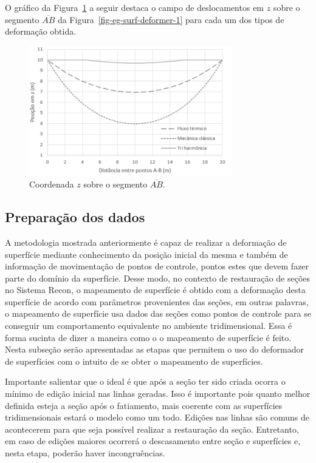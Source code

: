 O gráfico da Figura~\ref{fig-eg-surf-deformer-3} a seguir destaca o campo de deslocamentos em $z$ sobre o segmento $\overline{AB}$ da Figura~\ref{fig-eg-surf-deformer-1} para cada um dos tipos de deformação obtida.

\begin{figure} [H]
  \begin{center}
    \includegraphics[width=250pt]{images/fig-eg-surf-deformer-3}
    \caption{Coordenada $z$ sobre o segmento $\overline{AB}$.\cite{Muller}}\label{fig-eg-surf-deformer-3}
  \end{center}
\end{figure}

\subsection{Preparação dos dados}

 
A metodologia mostrada anteriormente é capaz de realizar a deformação de superfície mediante conhecimento da posição inicial da mesma e também de informação de movimentação de pontos de controle, pontos estes que devem fazer parte do domínio da superfície. Desse modo, no contexto de restauração de seções no Sistema Recon, o mapeamento de superfície é obtido com a deformação desta superfície de acordo com parâmetros provenientes das seções, em outras palavras, o mapeamento de superfície usa dados das seções como pontos de controle para se conseguir um comportamento equivalente no ambiente tridimensional. Essa é forma sucinta de dizer a maneira como o o mapeamento de superfície é feito. Nesta subseção serão apresentadas as etapas que permitem o uso do deformador de superfícies com o intuito de se obter o mapeamento de superfícies.

Importante salientar que o ideal é que após a seção ter sido criada ocorra o mínimo de edição inicial nas linhas geradas. Isso é importante pois quanto melhor definida esteja a seção após o fatiamento, mais coerente com as superfícies tridimensionais estará o modelo como um todo. Edições nas linhas são comuns de acontecerem para que seja possível realizar a restauração da seção. Entretanto, em caso de edições maiores ocorrerá o descasamento entre seção e superfícies e, nesta etapa, poderão haver incongruências.

